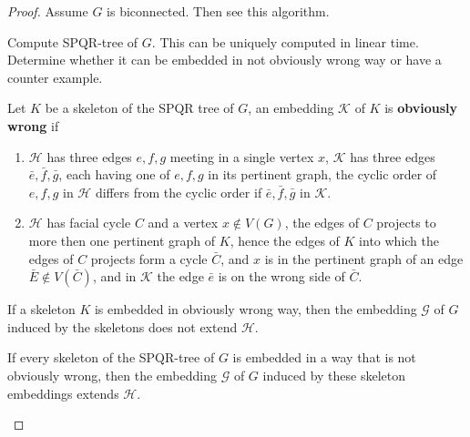 \begin{proof}
	Assume $G$ is biconnected. Then see this algorithm.
	
	\begin{algorithm}[!ht]
		\begin{algorithmic}[1]
			\State Compute SPQR-tree of $G$. This can be uniquely computed in linear time.
				\State \Return
			\EndIf
				\State Determine whether it can be embedded in not obviously wrong way or have a counter example.
			\EndFor
		\end{algorithmic}
	\end{algorithm}

	\begin{defn}
		Let $K$ be a skeleton of the SPQR tree of $G$, an embedding $\mathcal{K}$ of $K$ is \textbf{obviously wrong} if
		
		\begin{enumerate}
			\item $\mathcal{H}$ has three edges $e,f,g$ meeting in a single vertex $x$, $\mathcal{K}$ has three edges $\bar{e}, \bar{f}, \bar{g}$, each having one of $e,f,g$ in its pertinent graph, the cyclic order of $e,f,g$ in $\mathcal{H}$ differs from the cyclic order if $\bar{e}, \bar{f}, \bar{g}$ in $\mathcal{K}$.
			\item $\mathcal{H}$ has facial cycle $C$ and a vertex $x \notin V(G)$, the edges of $C$ projects to more then one pertinent graph of $K$, hence the edges of $K$ into which the edges of $C$ projects form a cycle $\bar{C}$, and $x$ is in the pertinent graph of an edge $\bar{E} \notin V(\bar{C})$, and in $\mathcal{K}$ the edge $\bar{e}$ is on the wrong side of $\bar{C}$. 
		\end{enumerate}
	\end{defn}

	\begin{observ}
		If a skeleton $K$ is embedded in obviously wrong way, then the embedding $\mathcal{G}$ of $G$ induced by the skeletons does not extend $\mathcal{H}$.
	\end{observ}

	\begin{thm}
		If every skeleton of the SPQR-tree of $G$ is embedded in a way that is not obviously wrong, then the embedding $\mathcal{G}$ of $G$ induced by these skeleton embeddings extends $\mathcal{H}$.
	\end{thm}
\end{proof}